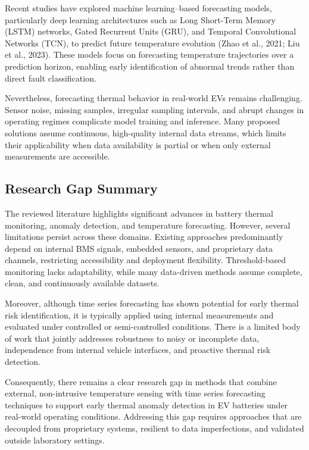\documentclass[conference]{IEEEtran}
\begin{document}
Recent studies have explored machine learning–based forecasting models, particularly deep learning architectures such as Long Short-Term Memory (LSTM) networks, Gated Recurrent Units (GRU), and Temporal Convolutional Networks (TCN), to predict future temperature evolution (Zhao et al., 2021; Liu et al., 2023). These models focus on forecasting temperature trajectories over a prediction horizon, enabling early identification of abnormal trends rather than direct fault classification.

Nevertheless, forecasting thermal behavior in real-world EVs remains challenging. Sensor noise, missing samples, irregular sampling intervals, and abrupt changes in operating regimes complicate model training and inference. Many proposed solutions assume continuous, high-quality internal data streams, which limits their applicability when data availability is partial or when only external measurements are accessible.

\subsection{Research Gap Summary}

The reviewed literature highlights significant advances in battery thermal monitoring, anomaly detection, and temperature forecasting. However, several limitations persist across these domains. Existing approaches predominantly depend on internal BMS signals, embedded sensors, and proprietary data channels, restricting accessibility and deployment flexibility. Threshold-based monitoring lacks adaptability, while many data-driven methods assume complete, clean, and continuously available datasets.

Moreover, although time series forecasting has shown potential for early thermal risk identification, it is typically applied using internal measurements and evaluated under controlled or semi-controlled conditions. There is a limited body of work that jointly addresses robustness to noisy or incomplete data, independence from internal vehicle interfaces, and proactive thermal risk detection.

Consequently, there remains a clear research gap in methods that combine external, non-intrusive temperature sensing with time series forecasting techniques to support early thermal anomaly detection in EV batteries under real-world operating conditions. Addressing this gap requires approaches that are decoupled from proprietary systems, resilient to data imperfections, and validated outside laboratory settings.
\end{document}

